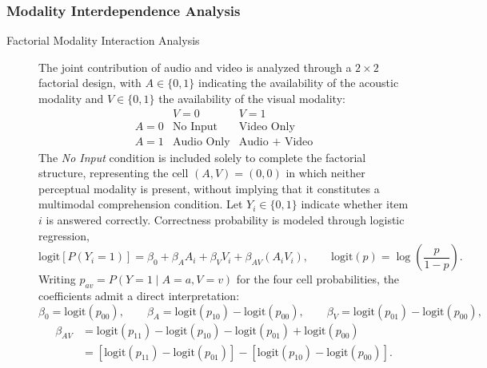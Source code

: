 \subsubsection*{Modality Interdependence Analysis}
\begin{description}
    \item[Factorial Modality Interaction Analysis] The joint contribution of audio and video is analyzed through a \(2 \times 2\) factorial design, with \(A \in \{0,1\}\) indicating the availability of the acoustic modality and \(V \in \{0,1\}\) the availability of the visual modality:
\begin{equation}
\begin{array}{c|cc}
 & V=0 & V=1 \\
\hline
A=0 & \text{No Input} & \text{Video Only} \\
A=1 & \text{Audio Only} & \text{Audio + Video}
\end{array}
\end{equation}
The \textit{No Input} condition is included solely to complete the factorial structure, representing the cell \((A,V)=(0,0)\) in which neither perceptual modality is present, without implying that it constitutes a multimodal comprehension condition.
Let \(Y_i \in \{0,1\}\) indicate whether item \(i\) is answered correctly. Correctness probability is modeled through logistic regression,
\begin{equation}
\mathrm{logit}
\left[
P(Y_i=1)
\right]
=
\beta_0
+
\beta_A A_i
+
\beta_V V_i
+
\beta_{AV}
\left(
A_i V_i
\right),
\qquad
\mathrm{logit}(p)
=
\log
\left(
\frac{p}{1-p}
\right).
\end{equation}
Writing \(p_{av} = P\left(Y=1 \mid A=a,V=v\right)\) for the four cell probabilities, the coefficients admit a direct interpretation:
\begin{equation}
\beta_0
=
\mathrm{logit}(p_{00}),
\qquad
\beta_A
=
\mathrm{logit}(p_{10})
-
\mathrm{logit}(p_{00}),
\qquad
\beta_V
=
\mathrm{logit}(p_{01})
-
\mathrm{logit}(p_{00}),
\end{equation}
\begin{equation}
\begin{split}
\beta_{AV}
&=
\mathrm{logit}(p_{11})
-
\mathrm{logit}(p_{10})
-
\mathrm{logit}(p_{01})
+
\mathrm{logit}(p_{00}) \\
&=
\left[
\mathrm{logit}(p_{11})
-
\mathrm{logit}(p_{01})
\right]
-
\left[
\mathrm{logit}(p_{10})
-
\mathrm{logit}(p_{00})
\right].
\end{split}
\end{equation}

\end{description}
